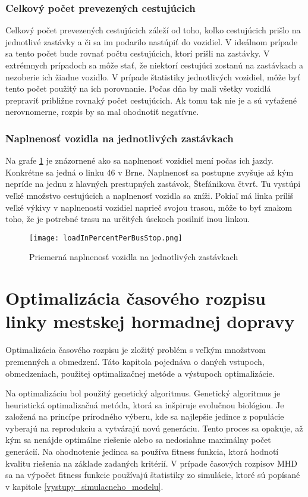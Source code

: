 \subsection*{Celkový počet prevezených cestujúcich}
Celkový počet prevezených cestujúcich záleží od toho, koľko cestujúcich prišlo na jednotlivé zastávky a či sa im podarilo nastúpiť do vozidiel.
V ideálnom prípade sa tento počet bude rovnať počtu cestujúcich, ktorí prišli na zastávky.
V extrémnych prípadoch sa môže stať, že niektorí cestujúci zostanú na zastávkach a nezoberie ich žiadne vozidlo.
V prípade štatistiky jednotlivých vozidiel, môže byť tento počet použitý na ich porovnanie.
Počas dňa by mali všetky vozidlá prepraviť približne rovnaký počet cestujúcich.
Ak tomu tak nie je a sú vyťažené nerovnomerne, rozpis by sa mal ohodnotiť negatívne.

\subsection*{Naplnenosť vozidla na jednotlivých zastávkach}
Na grafe \ref{fig:averageLoad} je znázornené ako sa naplnenosť vozidiel mení počas ich jazdy.
Konkrétne sa jedná o linku 46 v Brne.
Naplnenosť sa postupne zvyšuje až kým nepríde na jednu z hlavných prestupných zastávok, Štefánikova čtvrť.
Tu vystúpi veľké množstvo cestujúcich a naplnenosť vozidla sa zníži.
Pokiaľ má linka príliš veľké výkivy v naplnenosti vozidiel naprieč svojou trasou, môže to byť znakom toho, že je potrebné trasu na určitých úsekoch posilniť inou linkou.
\begin{figure}[h]
  \label{fig:averageLoad}
  \centering
  \texttt{[image: loadInPercentPerBusStop.png]}
  \caption{Priemerná naplnenosť vozidla na jednotlivých zastávkach}
\end{figure}

\chapter{Optimalizácia časového rozpisu linky mestskej hormadnej dopravy} %
\label{optimalizacia}

Optimalizácia časového rozpisu je zložitý problém s veľkým množstvom premenných a obmedzení.
Táto kapitola pojednáva o daných vstupoch, obmedzeniach, použitej optimalizačnej metóde a výstupoch optimalizácie.

Na optimalizáciu bol použitý genetický algoritmus.
Genetický algoritmus je heuristická optimalizačná metóda, ktorá sa inšpiruje evolučnou biológiou.
Je založená na princípe prírodného výberu, kde sa najlepšie jedince z populácie vyberajú na reprodukciu a vytvárajú novú generáciu.
Tento proces sa opakuje, až kým sa nenájde optimálne riešenie alebo sa nedosiahne maximálny počet generácií.
Na ohodnotenie jedinca sa používa fitness funkcia, ktorá hodnotí kvalitu riešenia na základe zadaných kritérií.
V prípade časových rozpisov MHD sa na výpočet fitness funkcie používajú štatistiky zo simulácie, ktoré sú popísané v kapitole \ref{vystupy_simulacneho_modelu}.

